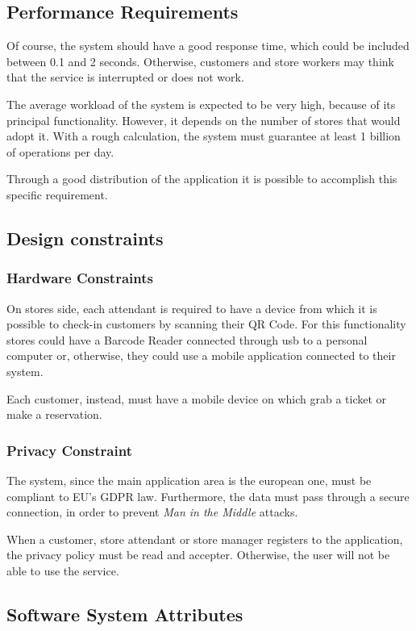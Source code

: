 \documentclass[table, 12pt]{article}
\begin{document}
\begin{flushleft}
    \subsection{Performance Requirements}
    Of course, the system should have a good response time, which could be included between 0.1 and 2 seconds.
    Otherwise, customers and store workers may think that the service is interrupted or does not work.

    The average workload of the system is expected to be very high, because of its principal functionality. However, it depends on the number of stores that would adopt it.
    With a rough calculation, the system must guarantee at least 1 billion of operations per day.

    Through a good distribution of the application it is possible to accomplish this specific requirement.

    \subsection{Design constraints}
    \subsubsection{Hardware Constraints}
    On stores side, each attendant is required to have a device from which it is possible to check-in customers by scanning their QR Code.
    For this functionality stores could have a Barcode Reader connected through usb to a personal computer or, otherwise, they could use a mobile application connected to their system.

    Each customer, instead, must have a mobile device on which grab a ticket or make a reservation.

    \subsubsection{Privacy Constraint}
    The system, since the main application area is the european one, must be compliant to EU's GDPR law. Furthermore, the data must pass through a secure connection, in order to prevent \textit{Man in the Middle} attacks.

    When a customer, store attendant or store manager registers to the application, the privacy policy must be read and accepter. Otherwise, the user will not be able to use the service.

    \subsection{Software System Attributes}

\end{flushleft}
\end{document}

